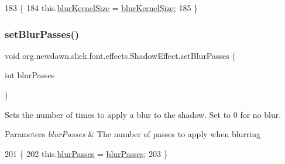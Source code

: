 \begin{DoxyCode}
183                                                        \{
184         this.\mbox{\hyperlink{classorg_1_1newdawn_1_1slick_1_1font_1_1effects_1_1_shadow_effect_a9383b2ba78f68f6302bfd9e9cb5de0f0}{blurKernelSize}} = \mbox{\hyperlink{classorg_1_1newdawn_1_1slick_1_1font_1_1effects_1_1_shadow_effect_a9383b2ba78f68f6302bfd9e9cb5de0f0}{blurKernelSize}};
185     \}
\end{DoxyCode}
\mbox{\label{classorg_1_1newdawn_1_1slick_1_1font_1_1effects_1_1_shadow_effect_a9443af6dd946ebe8219a63cd4965c581}} 
\subsubsection{\texorpdfstring{set\+Blur\+Passes()}{setBlurPasses()}}
{\footnotesize\ttfamily void org.\+newdawn.\+slick.\+font.\+effects.\+Shadow\+Effect.\+set\+Blur\+Passes (\begin{DoxyParamCaption}\item[{int}]{blur\+Passes }\end{DoxyParamCaption})\hspace{0.3cm}{\ttfamily [inline]}}

Sets the number of times to apply a blur to the shadow. Set to 0 for no blur.


\begin{DoxyParams}{Parameters}
{\em blur\+Passes} & The number of passes to apply when blurring \\
\hline
\end{DoxyParams}

\begin{DoxyCode}
201                                                \{
202         this.\mbox{\hyperlink{classorg_1_1newdawn_1_1slick_1_1font_1_1effects_1_1_shadow_effect_ae7079addc56e471f5c8747ffc8397a92}{blurPasses}} = \mbox{\hyperlink{classorg_1_1newdawn_1_1slick_1_1font_1_1effects_1_1_shadow_effect_ae7079addc56e471f5c8747ffc8397a92}{blurPasses}};
203     \}
\end{DoxyCode}
\mbox{\label{classorg_1_1newdawn_1_1slick_1_1font_1_1effects_1_1_shadow_effect_afca88dd56fbc192fabcd8853a7077532}} 
